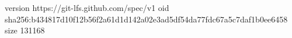 version https://git-lfs.github.com/spec/v1
oid sha256:b434817d10f12b56f2a61d1d142a02e3ad5df54da77fdc67a5c7daf1b0ee6458
size 131168
